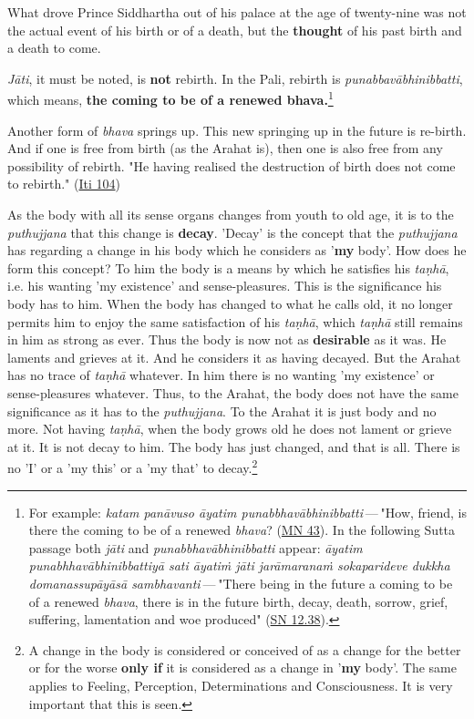 What drove Prince Siddhartha out of his
palace at the age of twenty-nine was not the actual event of his birth
or of a death, but the \textbf{thought} of his past birth and a death to come.


\emph{Jāti}, it must be noted, is \textbf{not} rebirth. In the Pali, rebirth is
\emph{punabbavābhinibbatti}, which means, \textbf{the coming to be of a renewed
bhava.}\footnote{For example: \emph{katam panāvuso āyatim punabbhavābhinibbatti} — "How, friend, is there the coming to be of a renewed \emph{bhava}? (\href{https://suttacentral.net/mn43/en/sujato}{MN 43}). In the following Sutta passage both \emph{jāti} and \emph{punabbhavābhinibbatti} appear: \emph{āyatim punabhhavābhinibbattiyā sati āyatiṁ jāti jarāmaranaṁ sokaparideve dukkha domanassupāyāsā sambhavanti} — "There being in the future a coming to be of a renewed \emph{bhava}, there is in the future birth, decay, death, sorrow, grief, suffering, lamentation and woe produced" (\href{https://suttacentral.net/sn12.38/en/bodhi}{SN 12.38}).}


Another form of \emph{bhava} springs up. This new springing up in the future is
re-birth. And if one is free from birth (as the Arahat is), then one is
also free from any possibility of rebirth. "He having realised the
destruction of birth does not come to rebirth." (\href{https://suttacentral.net/iti104/en/sujato}{Iti 104})


As the body with all its sense organs changes from youth to old age, it
is to the \emph{puthujjana} that this change is \textbf{decay}. 'Decay' is the
concept that the \emph{puthujjana} has regarding a change in his body which
he considers as '\textbf{my} body'. How does he form this concept? To him the
body is a means by which he satisfies his \emph{taṇhā}, i.e. his wanting
'my existence' and sense-pleasures. This is the significance his body
has to him. When the body has changed to what he calls old, it no longer
permits him to enjoy the same satisfaction of his \emph{taṇhā}, which
\emph{taṇhā} still remains in him as strong as ever. Thus the body is now not
as \textbf{desirable} as it was. He laments and grieves at it. And he considers
it as having decayed. But the Arahat has no trace of \emph{taṇhā} whatever.
In him there is no wanting 'my existence' or sense-pleasures whatever.
Thus, to the Arahat, the body does not have the same significance as it
has to the \emph{puthujjana}. To the Arahat it is just body and no more.
Not having \emph{taṇhā}, when the body grows old he does not lament or
grieve at it. It is not decay to him. The body has just changed, and
that is all. There is no 'I' or a 'my this' or a 'my that' to
decay.\footnote{A change in the body is considered or conceived of as a change for the better or for the worse \textbf{only if} it is considered as a change in '\textbf{my} body'. The same applies to Feeling, Perception, Determinations and Consciousness. It is very important that this is seen.}


